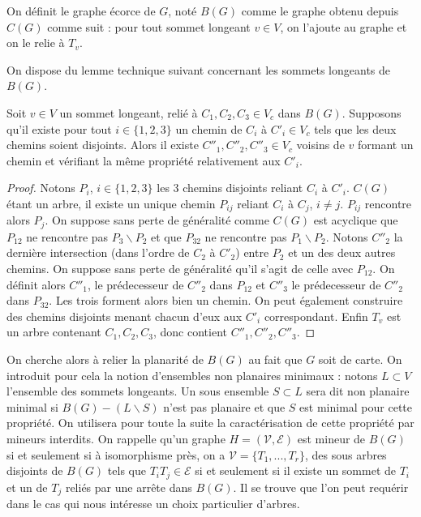 \documentclass{scrartcl}
\begin{document}
\begin{flushleft}
\begin{def*}
    On définit le graphe écorce de $G$, noté $B(G)$ comme le graphe obtenu depuis $C(G)$ comme suit :
    pour tout sommet longeant $v \in V$, on l'ajoute au graphe et on le relie à $T_v$.
\end{def*}

On dispose du lemme technique suivant concernant les sommets longeants de $B(G)$.

\begin{lem}\label{voislongpath}
    Soit $v \in V$ un sommet longeant, relié à $C_1, C_2, C_3 \in V_c$ dans $B(G)$. Supposons
    qu'il existe pour tout $i \in \{1,2,3\}$ un chemin de $C_i$ à $C'_i \in V_c$ tels que les
    deux chemins soient disjoints. Alors il existe $C''_1, C''_2, C''_3 \in V_c$ voisins de $v$
    formant un chemin et vérifiant la même propriété relativement aux $C'_i$.
\end{lem}

\begin{proof}
    Notons $P_i$, $i \in \{1, 2, 3\}$ les $3$ chemins disjoints reliant $C_i$ à $C'_i$.
    $C(G)$ étant un arbre, il existe un unique chemin $P_{ij}$ reliant $C_i$ à $C_j$,
    $i \neq j$. $P_{ij}$ rencontre alors $P_j$. On suppose sans perte de généralité
    comme $C(G)$ est acyclique que
    $P_{12}$ ne rencontre pas $P_3 \backslash P_2$ et que $P_{32}$ ne rencontre pas $P_1 \backslash P_2$.
    \medskip \newline
    Notons $C''_2$ la dernière intersection (dans l'ordre de $C_2$ à $C'_2$) entre $P_2$
    et un des deux autres chemins. On suppose sans perte de généralité qu'il s'agit de
    celle avec $P_{12}$. On définit alors $C''_1$, le prédecesseur de $C''_2$ dans
    $P_{12}$ et $C''_3$ le prédecesseur de $C''_2$ dans $P_{32}$. Les trois forment alors
    bien un chemin. On peut également construire des chemins disjoints menant chacun d'eux
    aux $C'_i$ correspondant. Enfin $T_v$ est un arbre contenant $C_1, C_2, C_3$, donc
    contient $C''_1, C''_2, C''_3$.
\end{proof}


On cherche alors à relier la planarité de $B(G)$ au fait que $G$ soit de carte. On introduit
pour cela la notion d'ensembles non planaires minimaux : notons $L \subset V$ l'ensemble
des sommets longeants. Un sous ensemble $S \subset L$ sera dit non planaire minimal si
$B(G) - (L\backslash S)$
n'est pas planaire et que $S$ est minimal pour cette propriété. On utilisera pour toute
la suite la caractérisation de cette propriété par mineurs interdits.
\medskip \newline
On rappelle qu'un graphe $H = (\mathcal{V}, \mathcal{E})$ est mineur de $B(G)$ si et seulement
si à isomorphisme près, on a $\mathcal{V} = \{T_1, ..., T_r\}$, des sous arbres disjoints
de $B(G)$ tels que $T_i T_j \in \mathcal{E}$ si et seulement si il existe un sommet
de $T_i$ et un de $T_j$ reliés par une arrête dans $B(G)$. Il se trouve que l'on peut requérir
dans le cas qui nous intéresse un choix particulier d'arbres.


\end{flushleft}
\end{document}
